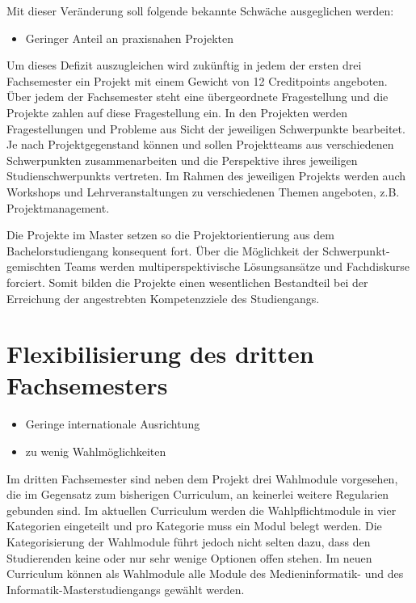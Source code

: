 Mit dieser Veränderung soll folgende bekannte Schwäche ausgeglichen
werden:

\begin{itemize}
\tightlist
\item
  Geringer Anteil an praxisnahen Projekten
\end{itemize}

Um dieses Defizit auszugleichen wird zukünftig in jedem der ersten drei
Fachsemester ein Projekt mit einem Gewicht von 12 Creditpoints
angeboten. Über jedem der Fachsemester steht eine übergeordnete
Fragestellung und die Projekte zahlen auf diese Fragestellung ein. In
den Projekten werden Fragestellungen und Probleme aus Sicht der
jeweiligen Schwerpunkte bearbeitet. Je nach Projektgegenstand können und
sollen Projektteams aus verschiedenen Schwerpunkten zusammenarbeiten und
die Perspektive ihres jeweiligen Studienschwerpunkts vertreten. Im
Rahmen des jeweiligen Projekts werden auch Workshops und
Lehrveranstaltungen zu verschiedenen Themen angeboten, z.B.
Projektmanagement.

Die Projekte im Master setzen so die Projektorientierung aus dem
Bachelorstudiengang konsequent fort. Über die Möglichkeit der
Schwerpunkt-gemischten Teams werden multiperspektivische Lösungsansätze
und Fachdiskurse forciert. Somit bilden die Projekte einen wesentlichen
Bestandteil bei der Erreichung der angestrebten Kompetenzziele des
Studiengangs.

\section{Flexibilisierung des dritten
Fachsemesters}\label{flexibilisierung-des-dritten-fachsemesters}

\begin{itemize}
\tightlist
\item
  Geringe internationale Ausrichtung
\item
  zu wenig Wahlmöglichkeiten
\end{itemize}

Im dritten Fachsemester sind neben dem Projekt drei Wahlmodule
vorgesehen, die im Gegensatz zum bisherigen Curriculum, an keinerlei
weitere Regularien gebunden sind. Im aktuellen Curriculum werden die
Wahlpflichtmodule in vier Kategorien eingeteilt und pro Kategorie muss
ein Modul belegt werden. Die Kategorisierung der Wahlmodule führt jedoch
nicht selten dazu, dass den Studierenden keine oder nur sehr wenige
Optionen offen stehen. Im neuen Curriculum können als Wahlmodule alle
Module des Medieninformatik- und des Informatik-Masterstudiengangs
gewählt werden.

